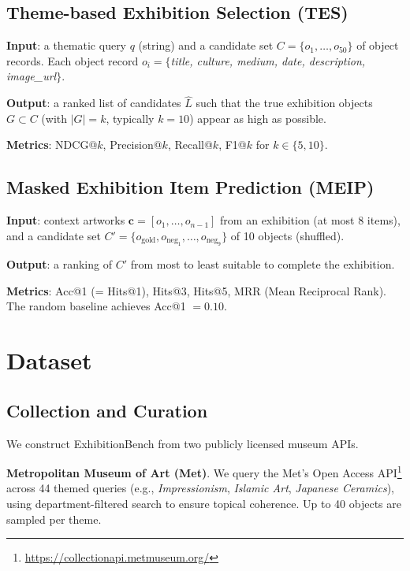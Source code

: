 \documentclass[11pt]{article}
\begin{document}
\subsection{Theme-based Exhibition Selection (TES)}

\textbf{Input}: a thematic query $q$ (string) and a candidate set
$C = \{o_1, \ldots, o_{50}\}$ of object records.
Each object record $o_i = \{$\textit{title, culture, medium, date, description,
image\_url}$\}$.

\textbf{Output}: a ranked list of candidates $\hat{L}$ such that the true
exhibition objects $G \subset C$ (with $|G| = k$, typically $k{=}10$) appear
as high as possible.

\textbf{Metrics}: NDCG@$k$, Precision@$k$, Recall@$k$, F1@$k$ for $k \in \{5, 10\}$.

\subsection{Masked Exhibition Item Prediction (MEIP)}

\textbf{Input}: context artworks $\mathbf{c} = [o_1, \ldots, o_{n-1}]$ from an
exhibition (at most 8 items), and a candidate set
$C' = \{o_\text{gold}, o_{\text{neg}_1}, \ldots, o_{\text{neg}_9}\}$ of 10
objects (shuffled).

\textbf{Output}: a ranking of $C'$ from most to least suitable to complete
the exhibition.

\textbf{Metrics}: Acc@1 (= Hits@1), Hits@3, Hits@5, MRR (Mean Reciprocal Rank).
The random baseline achieves Acc@1 $= 0.10$.

\section{Dataset}
\label{sec:data}

\subsection{Collection and Curation}

We construct ExhibitionBench from two publicly licensed museum APIs.

\noindent\textbf{Metropolitan Museum of Art (Met)}.
We query the Met's Open Access API\footnote{
  \url{https://collectionapi.metmuseum.org/}}
across 44 themed queries (e.g., \textit{Impressionism}, \textit{Islamic Art},
\textit{Japanese Ceramics}), using department-filtered search to ensure
topical coherence.
Up to 40 objects are sampled per theme.
\end{document}
